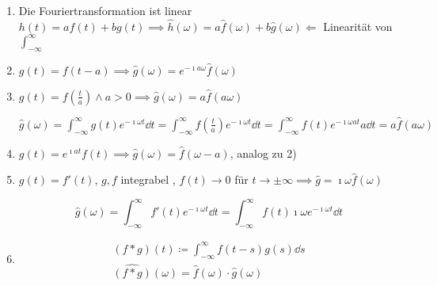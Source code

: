 \begin{enumerate}[label=\arabic*)]
	\item Die Fouriertransformation ist linear $h(t) = af(t) + bg(t) \implies \hat{h}(\omega) = a\hat{f}(\omega) + b\hat{g}(\omega) \Leftarrow$ Linearität von $\int_{-\infty}^\infty$
	\item $g(t) = f(t-a) \implies \hat{g}(\omega) = e^{-\imath a \omega} \hat{f}(\omega)$
	\item $g(t) = f\left( \frac{t}{a} \right) \wedge a > 0 \implies \hat{g}(\omega) = a \hat{f}(a\omega)$ \\
		\begin{bew}
			$\hat{g}(\omega) = \int_{-\infty}^\infty g(t) e^{-\imath\omega t} \dd t = \int_{-\infty}^\infty f\left( \frac{t}{a} \right) e^{-\imath\omega t} \dd t = \int_{-\infty}^\infty f(t) e^{-\imath\omega at} a \dd t = a \hat{f}(a\omega)$
		\end{bew}
	\item $g(t) = e^{\imath at} f(t) \implies \hat{g}(\omega) = \hat{f}(\omega - a)$, analog zu 2)
	\item $g(t) = f'(t)$, $g,f$ integrabel , $f(t) \rightarrow 0$ für $t \rightarrow \pm \infty \implies \hat{g} = \imath \omega \hat{f}(\omega)$ \\
		\begin{bew}
			\[ \hat{g}(\omega) = \int_{-\infty}^\infty f'(t) e^{-\imath \omega t} \dd t = \int_{-\infty}^\infty f(t) \imath\omega e^{-\imath \omega t} \dd t \]
		\end{bew}
	\item \begin{satz*}[note = Faltungssatz]
		\begin{gather*}
			(f*g)(t) \coloneqq \int_{-\infty}^\infty f(t-s) g(s) \dd s \\
			\widehat{(f*g)}(\omega) = \hat{f}(\omega) \cdot \hat{g}(\omega)
		\end{gather*}
	\end{satz*}
\end{enumerate}

